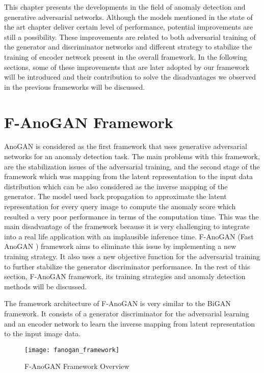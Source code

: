 
\begingroup

This chapter presents the developments in the field of anomaly detection and generative adversarial
networks. Although the models mentioned in the state of the art chapter deliver certain level of
performance, potential improvements are still a possibility. These improvements are related to both
adversarial training of the generator and discriminator networks and different strategy to stabilize
the training of encoder network present in the overall framework. In the following sections, some of
these improvements that are later adopted by our framework will be introduced and their contribution
to solve the disadvantages we observed in the previous frameworks will be discussed. 

\section{F-AnoGAN Framework}
\label{sec:fanogan}

AnoGAN \cite{Schlegl2017UnsupervisedAD} is considered as the first framework that uses generative
adversarial networks for an anomaly detection task. The main problems with this framework, are the
stabilization issues of the adversarial training, and the second stage of the framework which was
mapping from the latent representation to the input data distribution which can be also considered
as the inverse mapping of the generator. The model used back propagation to approximate the latent
representation for every query image to compute the anomaly score which resulted a very poor
performance in terms of the computation time. This was the main disadvantage of the framework
because it is very challenging to integrate into a real life application with an implausible
inference time. F-AnoGAN (Fast AnoGAN ) framework \cite{pub.1111824956} aims to eliminate this issue
by implementing a new training strategy. It also uses a new objective function for the adversarial
training to further stabilize the generator discriminator performance. In the rest of this section,
F-AnoGAN framework, its training strategies and anomaly detection methods will be discussed.

The framework architecture of F-AnoGAN is very similar to the BiGAN \cite{Donahue2017AdversarialFL}
framework. It consists of a generator discriminator for the adversarial learning and an encoder
network to learn the inverse mapping from latent representation to the input image data.
\begin{figure}[h!]
	\centering
	\texttt{[image: fanogan\_framework]}
	\caption{F-AnoGAN Framework Overview \cite{pub.1111824956}}
	\label{fig:fanogan_network}
\end{figure}

